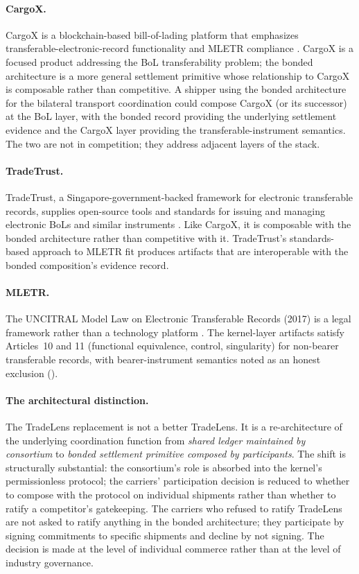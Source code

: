 \documentclass[11pt,a4paper]{article}
\theoremstyle{definition}
\theoremstyle{remark}
\begin{document}
\paragraph{CargoX.}
CargoX is a blockchain-based bill-of-lading platform that
emphasizes transferable-electronic-record functionality and
MLETR compliance \citep{cargox_2023}. CargoX is a focused product
addressing the BoL transferability problem; the bonded
architecture is a more general settlement primitive whose
relationship to CargoX is composable rather than competitive. A
shipper using the bonded architecture for the bilateral
transport coordination could compose CargoX (or its successor) at
the BoL layer, with the bonded record providing the underlying
settlement evidence and the CargoX layer providing the
transferable-instrument semantics. The two are not in
competition; they address adjacent layers of the stack.

\paragraph{TradeTrust.}
TradeTrust, a Singapore-government-backed framework for
electronic transferable records, supplies open-source tools and
standards for issuing and managing electronic BoLs and similar
instruments \citep{tradetrust_2023}. Like CargoX, it is composable
with the bonded architecture rather than competitive with it.
TradeTrust's standards-based approach to MLETR fit produces
artifacts that are interoperable with the bonded composition's
evidence record.

\paragraph{MLETR.}
The UNCITRAL Model Law on Electronic Transferable Records (2017)
is a legal framework rather than a technology platform
\citep{uncitral_mletr_2017}. The kernel-layer artifacts satisfy
Articles~10 and 11 (functional equivalence, control, singularity)
for non-bearer transferable records, with bearer-instrument
semantics noted as an honest exclusion ().

\paragraph{The architectural distinction.}
The TradeLens replacement is not a better TradeLens. It is a
re-architecture of the underlying coordination function from
\emph{shared ledger maintained by consortium} to
\emph{bonded settlement primitive composed by participants}. The
shift is structurally substantial: the consortium's role is
absorbed into the kernel's permissionless protocol; the carriers'
participation decision is reduced to whether to compose with the
protocol on individual shipments rather than whether to ratify a
competitor's gatekeeping. The carriers who refused to ratify
TradeLens are not asked to ratify anything in the bonded
architecture; they participate by signing commitments to specific
shipments and decline by not signing. The decision is made at
the level of individual commerce rather than at the level of
industry governance.
\end{document}
